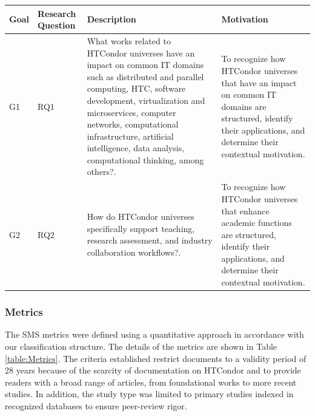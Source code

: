 \begin{table}
	{\begin{tabular}{p{0.5cm}p{1.4cm}p{6.0cm}p{4.5cm}} \toprule
			\textbf{Goal} & \textbf{Research Question} & \textbf{Description}                                                                                                                                                                                                                                                                                                & \textbf{Motivation}                                                                                                                                                  \\
			\midrule
			G1            & RQ1                        & What works related to HTCondor universes have an impact on common IT domains such as distributed and parallel computing, HTC, software development, virtualization and microservices, computer networks, computational infrastructure, artificial intelligence, data analysis, computational thinking, among others?. & To recognize how HTCondor universes that have an impact on common IT domains are structured, identify their applications, and determine their contextual motivation. \\
			G2            & RQ2                        & How do HTCondor universes specifically support teaching, research assessment, and industry collaboration workflows?.                                                                                                                                                                                         & To recognize how HTCondor universes that enhance academic functions are structured, identify their applications, and determine their contextual motivation.          \\
			\bottomrule
		\end{tabular}}
	\label{table:RQs}
\end{table}

\subsubsection{Metrics}
The SMS metrics were defined using a quantitative approach in accordance with our classification structure. The details of the metrics are shown in Table \ref{table:Metrics}. The criteria established restrict documents to a validity period of 28 years because of the scarcity of documentation on HTCondor and to provide readers with a broad range of articles, from foundational works to more recent studies. In addition, the study type was limited to primary studies indexed in recognized databases to ensure peer-review rigor.


